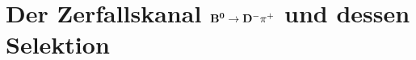 \chapter[head={Der Zerfallskanal $\Bz\rightarrow \Dm\pip$ und dessen Selektion},tocentry={Der Zerfallskanal $\mathbf{\Bz\rightarrow \Dm\pip}$ und dessen Selektion}]{Der Zerfallskanal $\mathbf{\Bz\rightarrow \Dm\pip}$ und dessen Selektion}

\Blindtext
